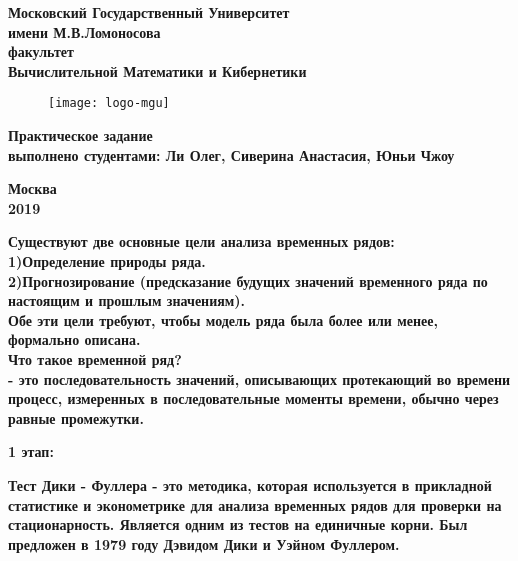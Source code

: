 \documentclass[12pt,a4paper]{paper}
\begin{document}
\begin{center}
\large\bfseries Московский Государственный Университет \\
\bfseries\large имени М.В.Ломоносова\\
\bfseries\large факультет \\
\bfseries\large Вычислительной Математики и Кибернетики
\end{center}
\vspace{1mm}
\begin{figure}[h]
\centering
\texttt{[image: logo-mgu]}
\end{figure}
\vspace{2mm}
\vspace{40mm}
\begin{center}
\bfseries\Large\bf Практическое задание 
\\
\bfseries\large выполнено студентами: Ли Олег, Сиверина Анастасия, Юньи Чжоу
\end{center}
\vspace{50mm}
\vspace{30mm}
\begin{center}
\bfseries\large Москва\\ 2019
\end{center}
\pagestyle{empty}
\newpage
\bfseries{Существуют две основные цели анализа временных рядов:} \mdseries\\ 

1)Определение природы ряда.\\ 

2)Прогнозирование (предсказание будущих значений временного ряда по настоящим и прошлым значениям).\\

Обе эти цели требуют, чтобы модель ряда была более или менее, формально описана.\\
 
\bfseries{Что такое временной ряд?} \mdseries\\
- это последовательность значений, описывающих протекающий во времени процесс, измеренных в последовательные моменты времени, обычно через равные промежутки.\\

\hline  \hline
\begin{center}
\bfseries\large{1 этап:}\\
\end{center}

\bfseries{Тест Дики - Фуллера} \mdseries - это методика, которая используется в прикладной статистике и эконометрике для анализа временных рядов для проверки на стационарность. Является одним из тестов на единичные корни. Был предложен в 1979 году Дэвидом Дики и Уэйном Фуллером.\\
\end{document}
